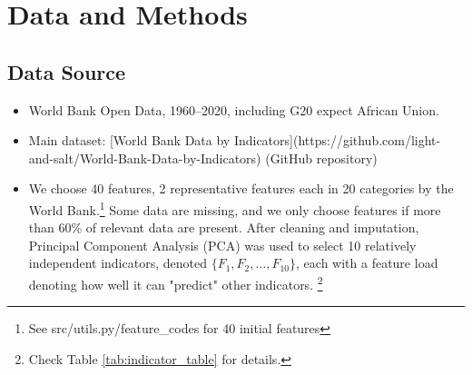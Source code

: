 \documentclass[12pt]{article}
\begin{document}
\section{Data and Methods}

\subsection{Data Source}

\begin{itemize}
    \item World Bank Open Data, 1960--2020, including G20 expect African Union.
    \item Main dataset: [World Bank Data by Indicators](https://github.com/light-and-salt/World-Bank-Data-by-Indicators) (GitHub repository)
    \item We choose 40 features, 2 representative features each in 20 categories by the World Bank.\footnote{See src/utils.py/feature\_codes for 40 initial features}
Some data are missing, and we only choose features if more than 60\% of relevant data are present. After cleaning and imputation, Principal Component Analysis (PCA) was used to select 10 relatively independent indicators, denoted $\{F_1, F_2, \ldots, F_{10}\}$, each with a feature load denoting how well it can "predict" other indicators. \footnote{Check Table \ref{tab:indicator_table} for details.}
\end{itemize}
\end{document}
